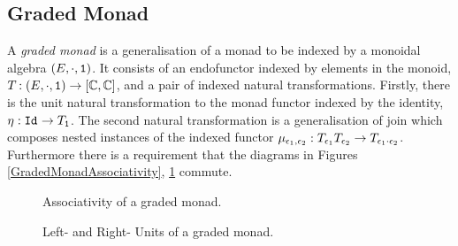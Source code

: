 \subsection{Graded Monad}


A \textit{graded monad} is a generalisation of a monad to be indexed by a monoidal algebra $(E,\cdot, \texttt{1})$. It consists of an endofunctor indexed by elements in the monoid, $T_{}{}: (E, \cdot, \texttt{1})  \rightarrow [\mathbb{C}, \mathbb{C}]$, and a pair of indexed natural transformations. Firstly, there is the unit natural transformation to the monad functor indexed by the identity, $\eta_{}: \texttt{Id}_{} \rightarrow T_{\texttt{1}}{}$. The second natural transformation is a generalisation of join which composes nested instances of the indexed functor $\mu_{\epsilon_1, \epsilon_2}: T_{\epsilon_1}{T_{\epsilon_2}{}} \rightarrow T_{\epsilon_1 \cdot \epsilon_2}{}$. Furthermore there is a requirement that the diagrams in Figures \ref{GradedMonadAssociativity}, \ref{GradedMonadUnits} commute.


\begin{figure}
        \centering
        \begin{minipage}{0.45\linewidth}
            \centering
            \begin{framed}
            \end{framed}
            \caption{Associativity of a graded monad.}
            \label{GradedMonadAssociativity}
        \end{minipage}\hfill
        \begin{minipage}{0.45\linewidth}
            \centering
            \begin{framed}
            \end{framed}
            \caption{Left- and Right- Units of a graded monad.}
            \label{GradedMonadUnits}
        \end{minipage}
\end{figure}


